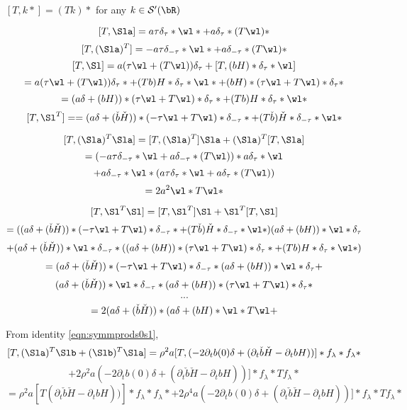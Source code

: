 $[T,k *] = (Tk)*$ for any $k \in {\cal S}'(\bR)$

\[
  [T,\Sla] = a \tau \delta_{\tau} * \wl* + a \delta_{\tau} * (T\wl)*
\]
\[
  [T,(\Sla)^T] = -a \tau \delta_{-\tau} * \wl* + a \delta_{-\tau}*(T\wl) *
\]
\[
  [T,\Sl] = a (\tau  \wl +  (T\wl) ) \delta_{\tau} + [T,(bH)*\delta_{\tau}*\wl]
\]
\[
  =a (\tau  \wl +  (T\wl) ) \delta_{\tau}* + (Tb)H *\delta_{\tau}*\wl* +
  (bH)*(\tau \wl + T\wl)*\delta_{\tau}*
\]
\[
  = (a\delta + (bH))*(\tau \wl +
  T\wl)*\delta_{\tau}* + (Tb)H *\delta_{\tau}*\wl*
\]
\[
[T,\Sl^T] =   = (a\delta + (\check{b}\check{H}))*(-\tau \wl +
  T\wl)*\delta_{-\tau}* + (T\check{b})\check{H} *\delta_{-\tau}*\wl*
\]

\[
  [T,(\Sla)^T\Sla] = [T,(\Sla)^T]\Sla + (\Sla)^T [T,\Sla]
\]
\[
= (-a \tau \delta_{-\tau} * \wl + a \delta_{-\tau}*(T\wl)) *
a\delta_{\tau} * \wl
\]
\[
  + a \delta_{-\tau} * \wl *  ( a \tau \delta_{\tau} * \wl + a
  \delta_{\tau} * (T\wl))
\]
\[
  = 2 a^2 \wl * T\wl *
\]

\[
  [T,\Sl^T\Sl] = [T,\Sl^T]\Sl + \Sl^T [T,\Sl]
\]
\[
  =((a\delta + (\check{b}\check{H}))*(-\tau \wl +
  T\wl)*\delta_{-\tau}* + (T\check{b})\check{H}
  *\delta_{-\tau}*\wl*)(a \delta + (bH))*\wl*\delta_{\tau}
\]
\[
  +(a \delta + (\check{b}\check{H}))*\wl*\delta_{-\tau}*
  ((a\delta + (bH))*(\tau \wl +
  T\wl)*\delta_{\tau}* + (Tb)H *\delta_{\tau}*\wl*)
\]
\[
=(a\delta + (\check{b}\check{H}))*(-\tau \wl +
T\wl)*\delta_{-\tau}*(a \delta + (bH))*\wl*\delta_{\tau} +
\]
\[
  (a \delta + (\check{b}\check{H}))*\wl*\delta_{-\tau}*(a\delta + (bH))*(\tau \wl +
  T\wl)*\delta_{\tau}*
\]
\[
  ...
\]
\[
  = 2(a \delta + (\check{b}\check{H}))*(a\delta + (bH)*\wl*T\wl +
\]

From identity \ref{eqn:symmprods0s1},
\[
  [T,(\Sla)^T\Slb+(\Slb)^T\Sla] = \rho^2 a[T,(-2\partial_t b(0) \delta +
  (\partial_t\check{b}\check{H}-\partial_tb
  H))]*f_{\lambda}*f_{\lambda}*
\]
\[
  + 2\rho^2 a (-2\partial_t b(0) \delta +
  (\partial_t\check{b}\check{H}-\partial_tb
  H))]*f_{\lambda}*Tf_{\lambda}*
\]
\[
  =
  \rho^2 a[ T (\partial_t\check{b}\check{H}-\partial_tb
  H))]*f_{\lambda}*f_{\lambda}* +  2\rho^4 a (-2\partial_t b(0) \delta +
  (\partial_t\check{b}\check{H}-\partial_tb
  H))]*f_{\lambda}*Tf_{\lambda}*
\]





